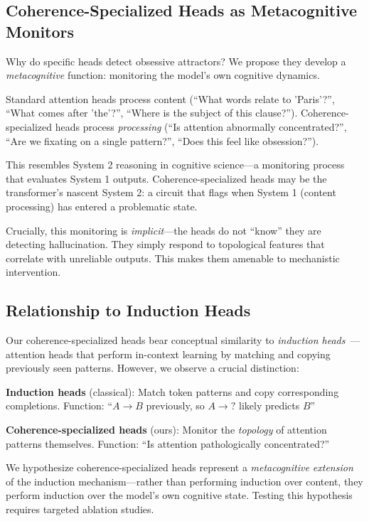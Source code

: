 \documentclass[11pt,twocolumn]{article}
\begin{document}
\subsection{Coherence-Specialized Heads as Metacognitive Monitors}

Why do specific heads detect obsessive attractors? We propose they develop a \textit{metacognitive} function: monitoring the model's own cognitive dynamics.

Standard attention heads process content (``What words relate to 'Paris'?'', ``What comes after 'the'?'', ``Where is the subject of this clause?''). Coherence-specialized heads process \textit{processing} (``Is attention abnormally concentrated?'', ``Are we fixating on a single pattern?'', ``Does this feel like obsession?'').

This resembles System 2 reasoning in cognitive science---a monitoring process that evaluates System 1 outputs. Coherence-specialized heads may be the transformer's nascent System 2: a circuit that flags when System 1 (content processing) has entered a problematic state.

Crucially, this monitoring is \textit{implicit}---the heads do not ``know'' they are detecting hallucination. They simply respond to topological features that correlate with unreliable outputs. This makes them amenable to mechanistic intervention.

\subsection{Relationship to Induction Heads}

Our coherence-specialized heads bear conceptual similarity to \textit{induction heads}~\cite{olsson2022context,elhage2021mathematical}---attention heads that perform in-context learning by matching and copying previously seen patterns. However, we observe a crucial distinction:

\textbf{Induction heads} (classical): Match token patterns and copy corresponding completions. Function: ``$A \rightarrow B$ previously, so $A \rightarrow ?$ likely predicts $B$''

\textbf{Coherence-specialized heads} (ours): Monitor the \textit{topology} of attention patterns themselves. Function: ``Is attention pathologically concentrated?''

We hypothesize coherence-specialized heads represent a \textit{metacognitive extension} of the induction mechanism---rather than performing induction over content, they perform induction over the model's own cognitive state. Testing this hypothesis requires targeted ablation studies.
\end{document}
